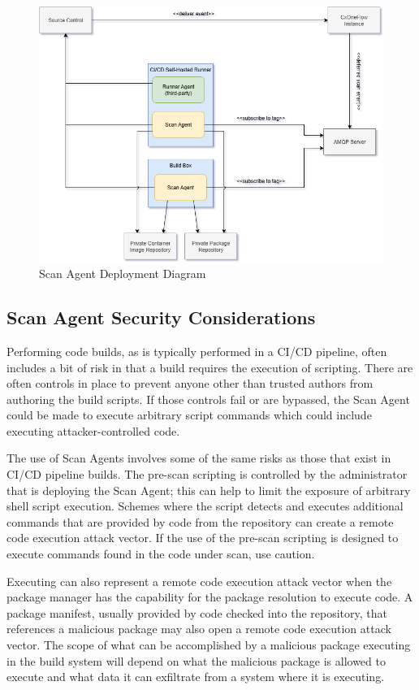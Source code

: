 \begin{figure}[ht]
  \includegraphics[width=\textwidth]{graphics/cxoneflow-diagrams-Scan Agent Diagram.png}
  \caption{Scan Agent Deployment Diagram}
  \label{fig:scan-agent-deployment-diagram}
\end{figure}


\subsection{Scan Agent Security Considerations}\label{sec:scan-agent-security-considerations}

Performing code builds, as is typically performed in a CI/CD pipeline, often includes
a bit of risk in that a build requires the execution of scripting.  There are often
controls in place to prevent anyone other than trusted authors from authoring the build scripts.
If those controls fail or are bypassed, the Scan Agent could be made to execute arbitrary
script commands which could include executing attacker-controlled code.

The use of Scan Agents involves some of the same risks as those that exist in
CI/CD pipeline builds.  The pre-scan scripting is controlled by the
administrator that is deploying the Scan Agent; this can help to limit the exposure
of arbitrary shell script execution.  Schemes where the script detects and executes
additional commands that are provided by code from the repository can create
a remote code execution attack vector.  If the use of the pre-scan scripting is designed
to execute commands found in the code under scan, use caution.

Executing \scaresolver can also represent a remote code execution attack vector when the package manager has
the capability for the package resolution to execute code.  A package manifest,
usually provided by code checked into the repository, that references a malicious package may also
open a remote code execution attack vector.  The scope of what can be accomplished by a malicious package
executing in the build system will depend on what the malicious package is allowed to execute and what data
it can exfiltrate from a system where it is executing.

